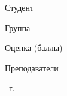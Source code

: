 \begin{titlepage}
\begin{center}
        \fontsize{14pt}{14pt}\selectfont

        \vfill

        \begin{flushleft}
            {Студент \uline{\myname \hfill}}

            \vspace{0.5cm}

            {Группа \uline{\mygroup \hfill}}

            \vspace{0.5cm}

            {Оценка (баллы) \uline{\hfill}}

            \vspace{0.5cm}

            {Преподаватели \uline{\teachers \hfill}}



            \vspace{0.5cm}

        \end{flushleft}

        \vfill

        \the\year\ г.

    \end{center}
\end{titlepage}


